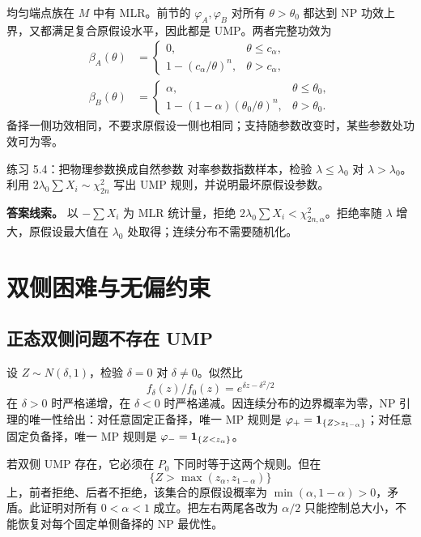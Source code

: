 均匀端点族在 $M$ 中有 MLR。前节的 $\varphi_A,\varphi_B$ 对所有 $\theta>\theta_0$ 都达到 NP 功效上界，又都满足复合原假设水平，因此都是 UMP。两者完整功效为
\begin{align*}
 \beta_A(\theta)&=
 \begin{cases}0,&\theta\le c_\alpha,\\1-(c_\alpha/\theta)^n,&\theta>c_\alpha,
 \end{cases}\\[3pt]
 \beta_B(\theta)&=
 \begin{cases}\alpha,&\theta\le\theta_0,\\
 1-(1-\alpha)(\theta_0/\theta)^n,&\theta>\theta_0.
 \end{cases}
\end{align*}
备择一侧功效相同，不要求原假设一侧也相同；支持随参数改变时，某些参数处功效可为零。

\begin{examplebox}{练习 5.4：把物理参数换成自然参数}
对率参数指数样本，检验 $\lambda\le\lambda_0$ 对 $\lambda>\lambda_0$。利用 $2\lambda_0\sum X_i\sim\chi^2_{2n}$ 写出 UMP 规则，并说明最坏原假设参数。

\textbf{答案线索。} 以 $-\sum X_i$ 为 MLR 统计量，拒绝 $2\lambda_0\sum X_i<\chi^2_{2n,\alpha}$。拒绝率随 $\lambda$ 增大，原假设最大值在 $\lambda_0$ 处取得；连续分布不需要随机化。
\end{examplebox}

\section{双侧困难与无偏约束}

\subsection{正态双侧问题不存在 UMP}

设 $Z\sim N(\delta,1)$，检验 $\delta=0$ 对 $\delta\ne0$。似然比
\[
 f_\delta(z)/f_0(z)=e^{\delta z-\delta^2/2}
\]
在 $\delta>0$ 时严格递增，在 $\delta<0$ 时严格递减。因连续分布的边界概率为零，NP 引理的唯一性给出：对任意固定正备择，唯一 MP 规则是
$\varphi_+=\mathbf 1_{\{Z>z_{1-\alpha}\}}$；对任意固定负备择，唯一 MP 规则是
$\varphi_-=\mathbf 1_{\{Z<z_\alpha\}}$。

若双侧 UMP 存在，它必须在 $P_0$ 下同时等于这两个规则。但在
\[
 \{Z>\max(z_\alpha,z_{1-\alpha})\}
\]
上，前者拒绝、后者不拒绝，该集合的原假设概率为 $\min(\alpha,1-\alpha)>0$，矛盾。此证明对所有 $0<\alpha<1$ 成立。把左右两尾各改为 $\alpha/2$ 只能控制总大小，不能恢复对每个固定单侧备择的 NP 最优性。

